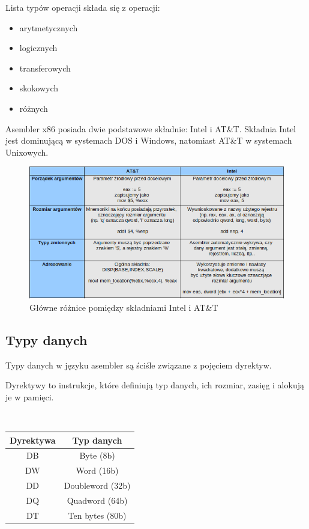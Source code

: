 \documentclass[a4paper,12pt]{article}
\begin{document}
Lista typów operacji składa się z operacji:
\begin{itemize}
\item arytmetycznych
\item logicznych
\item transferowych
\item skokowych
\item różnych
\end{itemize}

Asembler x86 posiada dwie podstawowe składnie: Intel i AT\&T. Składnia Intel jest dominującą w systemach DOS i Windows, natomiast AT\&T w systemach Unixowych\cite{asm_syn}.

\begin{figure}[h!]
\centering
\includegraphics[scale=0.6]{gfx/asm_syn_diff.png}
\caption{Główne różnice pomiędzy składniami Intel i AT\&T\cite{asm_syn}}
\end{figure}

\subsection{Typy danych}

Typy danych w języku asembler są ściśle związane z pojęciem dyrektyw.

Dyrektywy to instrukcje, które definiują typ danych, ich rozmiar, zasięg i alokują je w pamięci.

\\
\begin{center}
\begin{tabular}{|c|c|}
\hline 
Dyrektywa & Typ danych \\ 
\hline 
DB & Byte (8b) \\ 
\hline 
DW & Word (16b) \\ 
\hline 
DD & Doubleword (32b) \\ 
\hline 
DQ & Quadword (64b) \\ 
\hline 
DT & Ten bytes (80b) \\ 
\hline 
\end{tabular} 
\end{center}
\\
\end{document}
